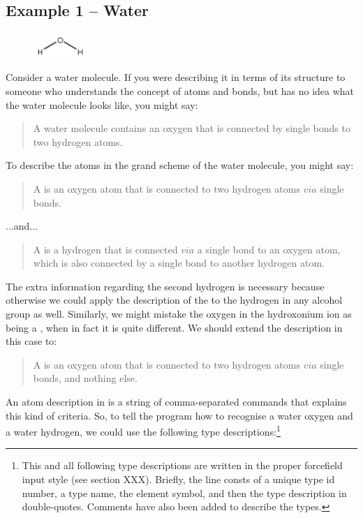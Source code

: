\subsection{Example 1 -- Water}
\begin{figure} \includegraphics[width=2cm]{images/water} \end{figure}
Consider a water molecule. If you were describing it in terms of its structure to someone who understands the concept of atoms and bonds, but has no idea what the water molecule looks like, you might say:

\begin{quote}
	A water molecule contains an oxygen that is connected by single bonds to two hydrogen atoms.
\end{quote}

To describe the atoms in the grand scheme of the water molecule, you might say:

\begin{quote}
	A  is an oxygen atom that is connected to two hydrogen atoms $via$ single bonds.
\end{quote}

...and...

\begin{quote}
	A  is a hydrogen that is connected $via$ a single bond to an oxygen atom, which is also connected by a single bond to another hydrogen atom.
\end{quote}

The extra information regarding the second hydrogen is necessary because otherwise we could apply the description of the  to the hydrogen in any alcohol group as well. Similarly, we might mistake the oxygen in the hydroxonium ion as being a , when in fact it is quite different. We should extend the description in this case to:

\begin{quote}
	A  is an oxygen atom that is connected to two hydrogen atoms $via$ single bonds, and nothing else.
\end{quote}

An atom description in \progname{} is a string of comma-separated commands that explains this kind of criteria. So, to tell the program how to recognise a water oxygen and a water hydrogen, we could use the following type descriptions:\footnote{This and all following type descriptions are written in the proper forcefield input style (see section XXX). Briefly, the line consts of a unique type id number, a type name, the element symbol, and then the type description in double-quotes. Comments have also been added to describe the types.}


